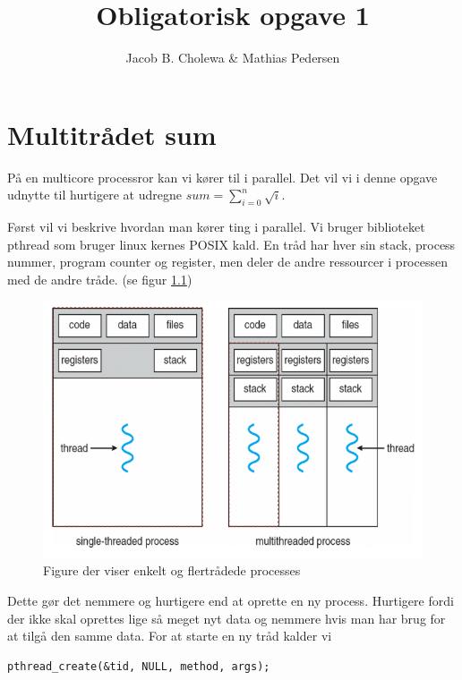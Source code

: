 \documentclass[danish]{report}
\title{Obligatorisk opgave 1}
\author{Jacob B. Cholewa \& Mathias Pedersen }
\begin{document}
\maketitle
\chapter{Multitrådet sum}
På en multicore processror kan vi kører til i parallel. Det vil vi i denne opgave udnytte til hurtigere at udregne $ sum = \displaystyle\sum\limits_{i=0}^n \sqrt{i} $.

Først vil vi beskrive hvordan man kører ting i parallel. Vi bruger biblioteket pthread som bruger linux kernes POSIX kald. En tråd har hver sin stack, process nummer, program counter og register, men deler de andre ressourcer i processen med de andre tråde. (se figur \ref{fig:1})


\begin{figure}[H]
\begin{center}
\includegraphics[scale=0.4]{img/1.png}
\caption{Figure der viser enkelt og flertrådede processes}
\label{fig:1}
\end{center}
\end{figure}


Dette gør det nemmere og hurtigere end at oprette en ny process. Hurtigere fordi der ikke skal oprettes lige så meget nyt data og nemmere hvis man har brug for at tilgå den samme data. For at starte en ny tråd kalder vi



\begin{lstlisting}
pthread_create(&tid, NULL, method, args);
\end{lstlisting}
\end{document}
